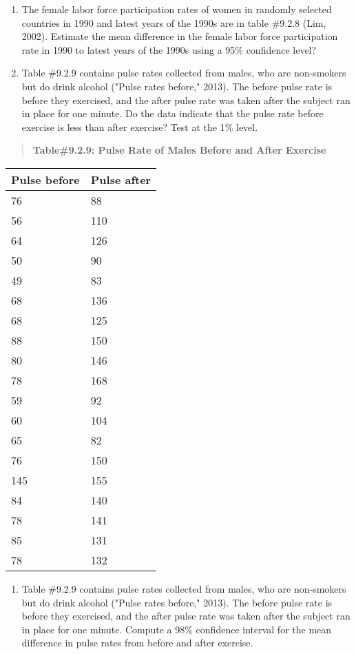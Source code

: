 \documentclass[]{book}
\providecommand{\tightlist}{%
  \setlength{\itemsep}{0pt}\setlength{\parskip}{0pt}}
\begin{document}
\begin{enumerate}
\def\labelenumi{\arabic{enumi}.}
\setcounter{enumi}{9}
\item
  The female labor force participation rates of women in randomly selected countries in 1990 and latest years of the 1990s are in table \#9.2.8 (Lim, 2002). Estimate the mean difference in the female labor force participation rate in 1990 to latest years of the 1990s using a 95\% confidence level?
\item
  Table \#9.2.9 contains pulse rates collected from males, who are non-smokers but do drink alcohol ("Pulse rates before," 2013). The before pulse rate is before they exercised, and the after pulse rate was taken after the subject ran in place for one minute. Do the data indicate that the pulse rate before exercise is less than after exercise? Test at the 1\% level.
\end{enumerate}

\begin{quote}
\textbf{Table\#9.2.9: Pulse Rate of Males Before and After Exercise}
\end{quote}

\begin{longtable}[]{@{}ll@{}}
\toprule
Pulse before & Pulse after\tabularnewline
\midrule
\endhead
76 & 88\tabularnewline
56 & 110\tabularnewline
64 & 126\tabularnewline
50 & 90\tabularnewline
49 & 83\tabularnewline
68 & 136\tabularnewline
68 & 125\tabularnewline
88 & 150\tabularnewline
80 & 146\tabularnewline
78 & 168\tabularnewline
59 & 92\tabularnewline
60 & 104\tabularnewline
65 & 82\tabularnewline
76 & 150\tabularnewline
145 & 155\tabularnewline
84 & 140\tabularnewline
78 & 141\tabularnewline
85 & 131\tabularnewline
78 & 132\tabularnewline
\bottomrule
\end{longtable}

\begin{enumerate}
\def\labelenumi{\arabic{enumi}.}
\setcounter{enumi}{11}
\tightlist
\item
  Table \#9.2.9 contains pulse rates collected from males, who are non-smokers but do drink alcohol ("Pulse rates before," 2013). The before pulse rate is before they exercised, and the after pulse rate was taken after the subject ran in place for one minute. Compute a 98\% confidence interval for the mean difference in pulse rates from before and after exercise.
\end{enumerate}

\textbf{\\
}
\end{document}
